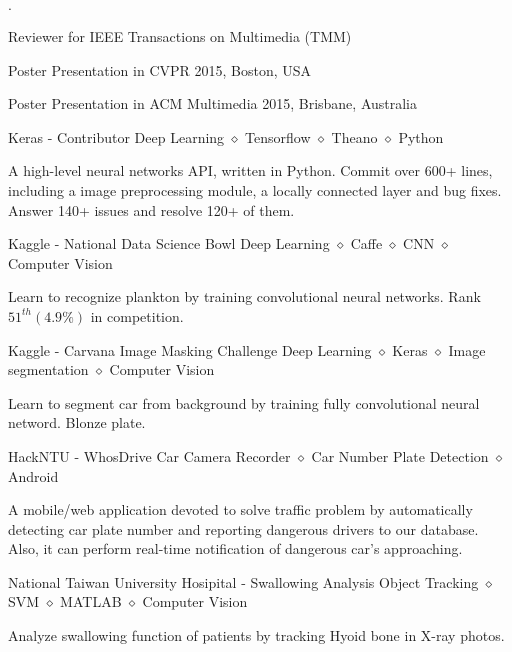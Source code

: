 \documentclass{joel_cv}
\begin{document}
%
%

\begin{sectionItemize}{$\cdot$}
	\item Reviewer for IEEE Transactions on Multimedia (TMM)
	\item Poster Presentation in CVPR 2015, Boston, USA
	\item Poster Presentation in ACM Multimedia 2015, Brisbane, Australia
\end{sectionItemize}

%
%


\begin{proj}{Keras - Contributor}
	{Deep Learning $\diamond$ Tensorflow $\diamond$ Theano $\diamond$ Python}
	\item A high-level neural networks API, written in Python. Commit over 600+ lines, including a image preprocessing module, a locally connected layer and bug fixes. Answer 140+ issues and resolve 120+ of them.
\end{proj}

\begin{proj}{Kaggle - National Data Science Bowl}
	{Deep Learning $\diamond$ Caffe $\diamond$ CNN $\diamond$ Computer Vision}
	\item Learn to recognize plankton by training convolutional neural networks. Rank $51^{th} (4.9\%)$ in competition.
\end{proj}

\begin{proj}{Kaggle - Carvana Image Masking Challenge}
	{Deep Learning $\diamond$ Keras $\diamond$ Image segmentation $\diamond$ Computer Vision}
	\item Learn to segment car from background by training fully convolutional neural netword. Blonze plate.
\end{proj}

\begin{proj}{HackNTU - WhosDrive}
	{Car Camera Recorder $\diamond$ Car Number Plate Detection $\diamond$ Android}
	\item A mobile/web application devoted to solve traffic problem by automatically detecting car plate number and reporting dangerous drivers to our database. Also, it can perform real-time notification of dangerous car's approaching.
\end{proj}

\begin{proj}{National Taiwan University Hosipital - Swallowing Analysis}
	{Object Tracking $\diamond$ SVM $\diamond$ MATLAB $\diamond$ Computer Vision}
	\item Analyze swallowing function of patients by tracking Hyoid bone in X-ray photos.
\end{proj}
\end{document}

